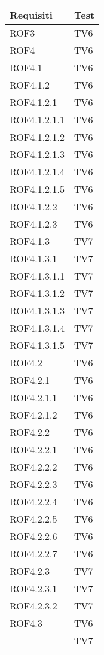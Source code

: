 \begin{center}
\begin{longtable}{|p{7cm}|p{7cm}|}
\toprule
\textbf{Requisiti} & \textbf{Test}\\
\midrule
ROF3 & TV6\\
\midrule
ROF4 & TV6\\
\midrule
ROF4.1 & TV6\\
\midrule
ROF4.1.2 & TV6\\
\midrule
ROF4.1.2.1 & TV6\\
\midrule
ROF4.1.2.1.1 & TV6\\
\midrule
ROF4.1.2.1.2 & TV6\\
\midrule
ROF4.1.2.1.3 & TV6\\
\midrule
ROF4.1.2.1.4 & TV6\\
\midrule
ROF4.1.2.1.5 & TV6\\
\midrule
ROF4.1.2.2 & TV6\\
\midrule
ROF4.1.2.3 & TV6\\
\midrule
ROF4.1.3 & TV7\\
\midrule
ROF4.1.3.1 & TV7\\
\midrule
ROF4.1.3.1.1 & TV7\\
\midrule
ROF4.1.3.1.2 & TV7\\
\midrule
ROF4.1.3.1.3 & TV7\\
\midrule
ROF4.1.3.1.4 & TV7\\
\midrule
ROF4.1.3.1.5 & TV7\\
\midrule
ROF4.2 & TV6\\
\midrule
ROF4.2.1 & TV6\\
\midrule
ROF4.2.1.1 & TV6\\
\midrule
ROF4.2.1.2 & TV6\\
\midrule
ROF4.2.2 & TV6\\
\midrule
ROF4.2.2.1 & TV6\\
\midrule
ROF4.2.2.2 & TV6\\
\midrule
ROF4.2.2.3 & TV6\\
\midrule
ROF4.2.2.4 & TV6\\
\midrule
ROF4.2.2.5 & TV6\\
\midrule
ROF4.2.2.6 & TV6\\
\midrule
ROF4.2.2.7 & TV6\\
\midrule
ROF4.2.3 & TV7\\
\midrule
ROF4.2.3.1 & TV7\\
\midrule
ROF4.2.3.2 & TV7\\
\midrule
ROF4.3 & TV6\\ & TV7\\

\end{longtable}
\end{center}
